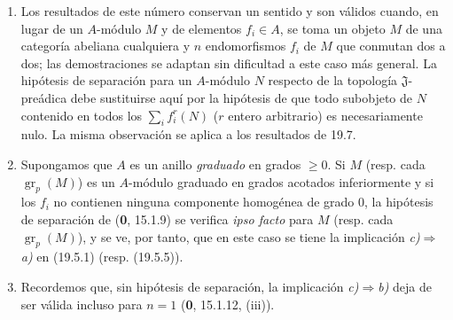 \begin{remarks}[19.5.6]
\label{IV.19.5.6}
\begin{enumerate}
  \item[(i)] Los resultados de este número conservan un sentido y son válidos cuando, en lugar de un $A$-módulo $M$ y de elementos $f_i\in A$, se toma un objeto $M$ de una categoría abeliana cualquiera y $n$ endomorfismos $f_i$ de $M$ que conmutan dos a dos; las demostraciones se adaptan sin dificultad a este caso más general. La hipótesis de separación para un $A$-módulo $N$ respecto de la topología $\mathfrak J$-preádica debe sustituirse aquí por la hipótesis de que todo subobjeto de $N$ contenido en todos los $\sum_i f_i^r(N)$ ($r$ entero arbitrario) es necesariamente nulo. La misma observación se aplica a los resultados de 19.7.
  \item[(ii)] Supongamos que $A$ es un anillo \emph{graduado} en grados $\geq0$. Si $M$ (resp. cada $\operatorname{gr}_p(M)$) es un $A$-módulo graduado en grados acotados inferiormente y si los $f_i$ no contienen ninguna componente homogénea de grado $0$, la hipótesis de separación de (\textbf{0}, 15.1.9) se verifica \emph{ipso facto} para $M$ (resp. cada $\operatorname{gr}_p(M)$), y se ve, por tanto, que en este caso se tiene la implicación \emph{c)}$\Rightarrow$\emph{a)} en (19.5.1) (resp. (19.5.5)).
  \item[(iii)] Recordemos que, sin hipótesis de separación, la implicación \emph{c)}$\Rightarrow$\emph{b)} deja de ser válida incluso para $n=1$ (\textbf{0}, 15.1.12, (iii)).
\end{enumerate}
\end{remarks}
